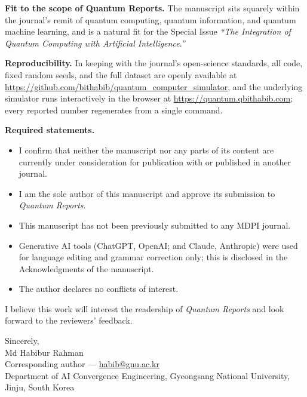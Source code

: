 \documentclass[11pt]{article}
\begin{document}
\textbf{Fit to the scope of Quantum Reports.} The manuscript sits squarely within
the journal's remit of quantum computing, quantum information, and quantum machine
learning, and is a natural fit for the Special Issue \textit{``The Integration of
Quantum Computing with Artificial Intelligence.''}

\textbf{Reproducibility.} In keeping with the journal's open-science standards, all
code, fixed random seeds, and the full dataset are openly available at
\url{https://github.com/bithabib/quantum_computer_simulator}, and the underlying
simulator runs interactively in the browser at
\url{https://quantum.qbithabib.com}; every reported number regenerates from a
single command.

\textbf{Required statements.}
\begin{itemize}[nosep,leftmargin=1.4em,itemsep=1.5pt]
\item I confirm that neither the manuscript nor any parts of its content are
currently under consideration for publication with or published in another journal.
\item I am the sole author of this manuscript and approve its submission to
\textit{Quantum Reports}.
\item This manuscript has not been previously submitted to any MDPI journal.
\item Generative AI tools (ChatGPT, OpenAI; and Claude, Anthropic) were used for
language editing and grammar correction only; this is disclosed in the
Acknowledgments of the manuscript.
\item The author declares no conflicts of interest.
\end{itemize}

I believe this work will interest the readership of \textit{Quantum Reports} and
look forward to the reviewers' feedback.

\vspace{0.3em}
\noindent Sincerely, \\[0.6em]
Md Habibur Rahman \\
Corresponding author --- \href{mailto:habib@gnu.ac.kr}{habib@gnu.ac.kr} \\
Department of AI Convergence Engineering, Gyeongsang National University, Jinju,
South Korea
\end{document}
